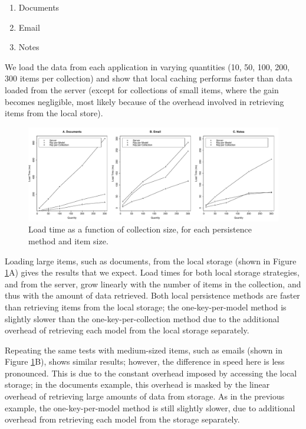 \documentclass[12pt]{article}
\begin{document}
\begin{enumerate}
\item Documents
\item Email
\item Notes
\end{enumerate}

We load the data from each application in varying quantities (10, 50, 100, 200,
300 items per collection) and show that local caching performs faster than data
loaded from the server (except for collections of small items, where the gain
becomes negligible, most likely because of the overhead involved in retrieving
items from the local store).

\begin{figure}[th]
  \centering
  \includegraphics[width=\textwidth]{lines.pdf}
  \caption{Load time as a function of collection size, for each persistence
  method and item size.}
  \label{fig:line}
\end{figure}

Loading large items, such as documents, from the local storage (shown in Figure
\ref{fig:line}A) gives the results that we expect. Load times for both
local storage strategies, and from the server, grow linearly with the number of
items in the collection, and thus with the amount of data retrieved. Both local
persistence methods are faster than retrieving items from the local storage;
the one-key-per-model method is slightly slower than the one-key-per-collection
method due to the additional overhead of retrieving each model from the local
storage separately.

Repeating the same tests with medium-sized items, such as emails (shown in
Figure \ref{fig:line}B), shows similar results; however, the difference in
speed here is less pronounced. This is due to the constant overhead imposed by
accessing the local storage; in the documents example, this overhead is masked
by the linear overhead of retrieving large amounts of data from storage. As in
the previous example, the one-key-per-model method is still slightly slower,
due to additional overhead from retrieving each model from the storage
separately.
\end{document}
